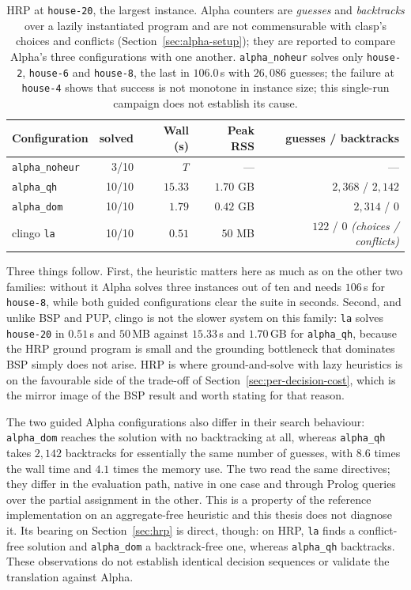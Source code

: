 \begin{table}[H]
\centering
\small
\begin{tabular}{lrrrr}
\toprule
\textbf{Configuration} & \textbf{solved} & \textbf{Wall (s)} & \textbf{Peak RSS} & \textbf{guesses / backtracks}\\
\midrule
\texttt{alpha\_noheur} & 3/10  & \emph{T}   & ---      & --- \\
\texttt{alpha\_qh}     & 10/10 & $15.33$    & $1.70$ GB & $2{,}368$ / $2{,}142$\\
\texttt{alpha\_dom}    & 10/10 & $1.79$     & $0.42$ GB & $2{,}314$ / $0$\\
\midrule
clingo \texttt{la}     & 10/10 & $0.51$     & $50$ MB   & $122$ / $0$ \emph{(choices / conflicts)}\\
\bottomrule
\end{tabular}
\caption{HRP at \texttt{house-20}, the largest instance. Alpha counters are \emph{guesses} and \emph{backtracks} over a lazily instantiated program and are not commensurable with clasp's choices and conflicts (Section~\ref{sec:alpha-setup}); they are reported to compare Alpha's three configurations with one another. \texttt{alpha\_noheur} solves only \texttt{house-2}, \texttt{house-6} and \texttt{house-8}, the last in $106.0$\,s with $26{,}086$ guesses; the failure at \texttt{house-4} shows that success is not monotone in instance size; this single-run campaign does not establish its cause.}
\label{tab:alpha-hrp}
\end{table}

Three things follow. First, the heuristic matters here as much as on the other two families: without it Alpha solves three instances out of ten and needs $106$\,s for \texttt{house-8}, while both guided configurations clear the suite in seconds. Second, and unlike BSP and PUP, clingo is not the slower system on this family: \texttt{la} solves \texttt{house-20} in $0.51$\,s and $50$\,MB against $15.33$\,s and $1.70$\,GB for \texttt{alpha\_qh}, because the HRP ground program is small and the grounding bottleneck that dominates BSP simply does not arise. HRP is where ground-and-solve with lazy heuristics is on the favourable side of the trade-off of Section~\ref{sec:per-decision-cost}, which is the mirror image of the BSP result and worth stating for that reason.

The two guided Alpha configurations also differ in their search behaviour: \texttt{alpha\_dom} reaches the solution with no backtracking at all, whereas \texttt{alpha\_qh} takes $2{,}142$ backtracks for essentially the same number of guesses, with $8.6$ times the wall time and $4.1$ times the memory use. The two read the same directives; they differ in the evaluation path, native in one case and through Prolog queries over the partial assignment in the other. This is a property of the reference implementation on an aggregate-free heuristic and this thesis does not diagnose it. Its bearing on Section~\ref{sec:hrp} is direct, though: on HRP, \texttt{la} finds a conflict-free solution and \texttt{alpha\_dom} a backtrack-free one, whereas \texttt{alpha\_qh} backtracks. These observations do not establish identical decision sequences or validate the translation against Alpha.


